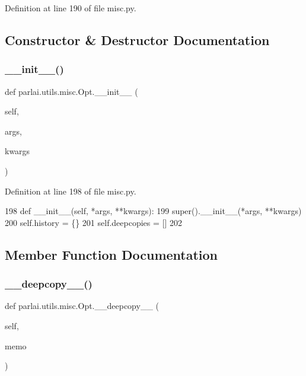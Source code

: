 Definition at line 190 of file misc.\+py.



\subsection{Constructor \& Destructor Documentation}
\mbox{\label{classparlai_1_1utils_1_1misc_1_1Opt_aa47125b32a0e6388def87e4542f92432}} 
\subsubsection{\texorpdfstring{\+\_\+\+\_\+init\+\_\+\+\_\+()}{\_\_init\_\_()}}
{\footnotesize\ttfamily def parlai.\+utils.\+misc.\+Opt.\+\_\+\+\_\+init\+\_\+\+\_\+ (\begin{DoxyParamCaption}\item[{}]{self,  }\item[{}]{args,  }\item[{}]{kwargs }\end{DoxyParamCaption})}



Definition at line 198 of file misc.\+py.


\begin{DoxyCode}
198     \textcolor{keyword}{def }\_\_init\_\_(self, *args, **kwargs):
199         super().\_\_init\_\_(*args, **kwargs)
200         self.history = \{\}
201         self.deepcopies = []
202 
\end{DoxyCode}


\subsection{Member Function Documentation}
\mbox{\label{classparlai_1_1utils_1_1misc_1_1Opt_a62062801645aec9a868f063e4ddb6407}} 
\subsubsection{\texorpdfstring{\+\_\+\+\_\+deepcopy\+\_\+\+\_\+()}{\_\_deepcopy\_\_()}}
{\footnotesize\ttfamily def parlai.\+utils.\+misc.\+Opt.\+\_\+\+\_\+deepcopy\+\_\+\+\_\+ (\begin{DoxyParamCaption}\item[{}]{self,  }\item[{}]{memo }\end{DoxyParamCaption})}

